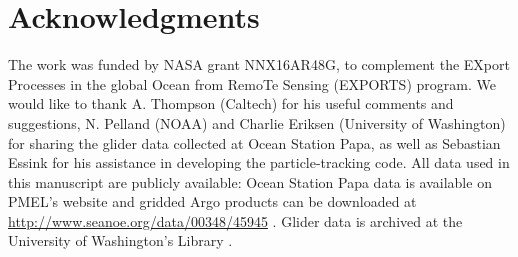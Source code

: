 \documentclass[article,linenumbers]{agujournal2018}
\begin{document}
	\section*{Acknowledgments}
	The work was funded by NASA grant NNX16AR48G, to complement the EXport Processes in the global Ocean from RemoTe Sensing (EXPORTS) program. We would like to thank A. Thompson (Caltech) for his useful comments and suggestions, N. Pelland (NOAA) and Charlie Eriksen (University of Washington) for sharing the glider data collected at Ocean Station Papa, as well as Sebastian Essink for his assistance in developing the particle-tracking code. All data used in this manuscript are publicly available: Ocean Station Papa data is available on PMEL's website \citep[\url{https://www.pmel.noaa.gov/ocs/Papa};][]{PMEL_data} and gridded Argo products can be downloaded at \url{http://www.seanoe.org/data/00348/45945} \citep{Gaillard_2015}. Glider data is archived at the University of Washington's Library \citep[\url{http://hdl.handle.net/1773/41656};][]{Pelland_2018_data}. %
	
	
	
	
	
	
	
	
\end{document}
